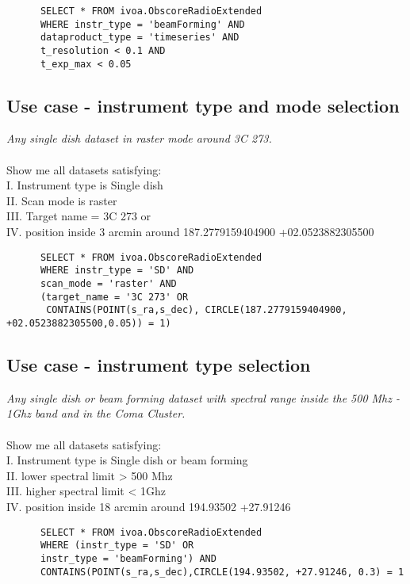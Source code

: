 \begin{verbatim}
      SELECT * FROM ivoa.ObscoreRadioExtended
      WHERE instr_type = 'beamForming' AND
      dataproduct_type = 'timeseries' AND
      t_resolution < 0.1 AND
      t_exp_max < 0.05 
\end{verbatim}
\subsection{Use case -  instrument type and mode selection }
\textit{Any single dish  dataset  in raster mode around 3C 273.}\\ \\
Show me all datasets satisfying:\\
I. Instrument type is Single dish \\
II. Scan mode is raster \\
III. Target name = 3C 273 or \\
IV. position inside 3 arcmin around  	187.2779159404900 +02.0523882305500
\begin{verbatim}
      SELECT * FROM ivoa.ObscoreRadioExtended
      WHERE instr_type = 'SD' AND
      scan_mode = 'raster' AND
      (target_name = '3C 273' OR
       CONTAINS(POINT(s_ra,s_dec), CIRCLE(187.2779159404900, +02.0523882305500,0.05)) = 1)     
\end{verbatim}

\subsection{Use case - instrument type selection}
\textit{Any single dish or beam forming dataset  with spectral range inside the 500 Mhz - 1Ghz band and in the Coma Cluster.}\\ \\
Show me all datasets satisfying:\\
I. Instrument type is Single dish or beam forming \\
II. lower spectral limit > 500 Mhz \\
III. higher spectral limit < 1Ghz \\
IV. position inside 18 arcmin around 194.93502 +27.91246
\begin{verbatim}
      SELECT * FROM ivoa.ObscoreRadioExtended
      WHERE (instr_type = 'SD' OR
      instr_type = 'beamForming') AND
      CONTAINS(POINT(s_ra,s_dec),CIRCLE(194.93502, +27.91246, 0.3) = 1     
\end{verbatim}


